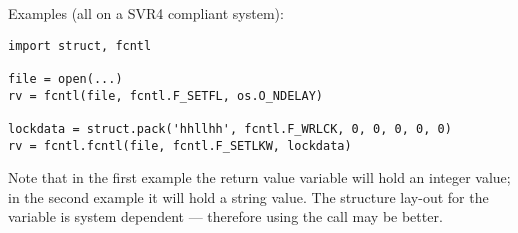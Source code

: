 Examples (all on a SVR4 compliant system):

\begin{verbatim}
import struct, fcntl

file = open(...)
rv = fcntl(file, fcntl.F_SETFL, os.O_NDELAY)

lockdata = struct.pack('hhllhh', fcntl.F_WRLCK, 0, 0, 0, 0, 0)
rv = fcntl.fcntl(file, fcntl.F_SETLKW, lockdata)
\end{verbatim}

Note that in the first example the return value variable  will
hold an integer value; in the second example it will hold a string
value.  The structure lay-out for the  variable is
system dependent --- therefore using the  call may be
better.
